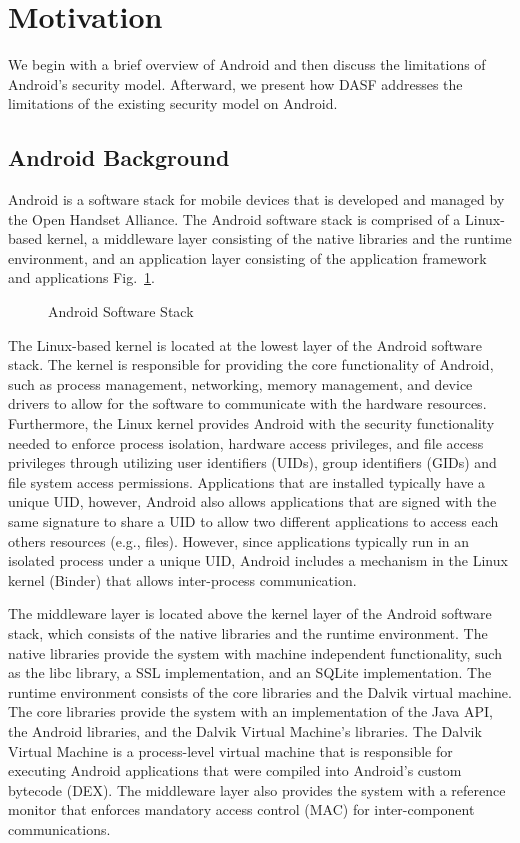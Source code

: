 \section{Motivation}

We begin with a brief overview of Android and then discuss the
limitations of Android's security model.  Afterward, we present
how DASF addresses the limitations of the existing
security model on Android.

\subsection{Android Background}

Android is a software stack for mobile devices that is developed 
and managed by the Open Handset Alliance. The Android software 
stack is comprised of a Linux-based kernel, a middleware layer 
consisting of the native libraries and the runtime environment, 
and an application layer consisting of the application framework 
and applications Fig.~\ref{fig:android}.

\begin{figure}[ht]
\centering
{}
\caption{Android Software Stack}
\label{fig:android}
\end{figure}

The Linux-based kernel is located at the lowest layer of the 
Android software stack. The kernel is responsible for providing 
the core functionality of Android, such as process management, 
networking, memory management, and device drivers to allow for 
the software to communicate with the hardware resources. 
Furthermore, the Linux kernel provides Android with the security 
functionality needed to enforce process isolation, hardware 
access privileges, and file access privileges through utilizing 
user identifiers (UIDs), group identifiers (GIDs) and file 
system access permissions.  Applications that are installed
typically have a unique UID, however, Android also allows
applications that are signed with the same signature to share
a UID to allow two different applications to access each others
resources (e.g., files).  However, since applications typically
run in an isolated process under a unique UID, Android includes
a mechanism in the Linux kernel (Binder) that allows
inter-process communication.

The middleware layer is located above the kernel layer of the 
Android software stack, which consists of the native libraries 
and the runtime environment. The native libraries provide the 
system with machine independent functionality, such as the libc 
library, a SSL implementation, and an SQLite implementation. 
The runtime environment consists of the core libraries and the 
Dalvik virtual machine. The core libraries provide the system 
with an implementation of the Java API, the Android libraries, 
and the Dalvik Virtual Machine's libraries. The Dalvik Virtual 
Machine is a process-level virtual machine that is responsible 
for executing Android applications that were compiled into 
Android's custom bytecode (DEX). The middleware layer also 
provides the system with a reference monitor that enforces 
mandatory access control (MAC) for inter-component 
communications.

